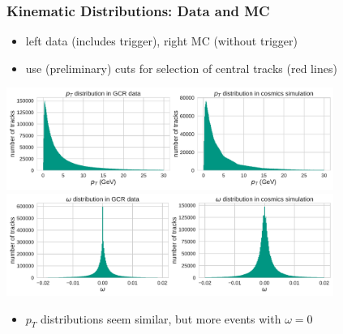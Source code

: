 \documentclass[18pt]{beamer}
\begin{document}
  \begin{frame}
    \frametitle{Kinematic Distributions: Data and MC}
    \begin{itemize}
    \item left data (includes trigger), right MC (without trigger)
    \item use (preliminary) cuts for selection of central tracks (red lines)
    \end{itemize}
    \begin{center}
      \includegraphics[width=0.8\textwidth]{figures/distributions/gcr_pt_distribution_uncut.pdf}\\
      \includegraphics[width=0.8\textwidth]{figures/distributions/gcr_omega_distribution_uncut.pdf}
    \end{center}
    \begin{itemize}
    \item $p_T$ distributions seem similar, but more events with $\omega = 0$
    \end{itemize}
  \end{frame}
\end{document}

